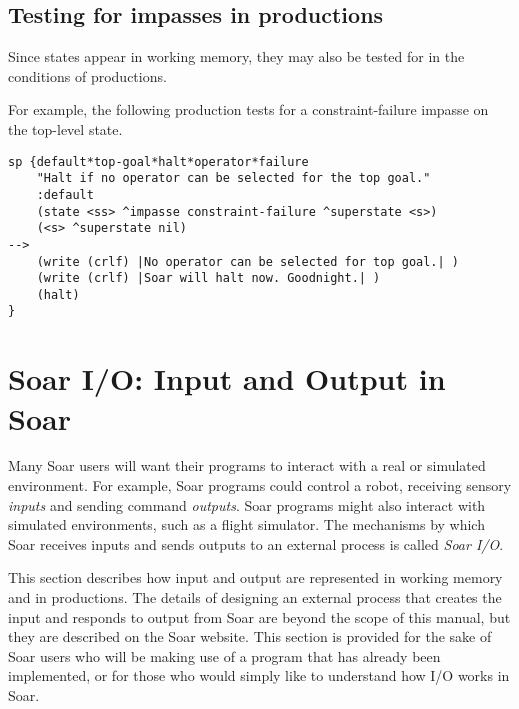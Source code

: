 \subsection{Testing for impasses in productions}

Since states appear in working memory, they may also be
tested for in the conditions of productions.


For example, the following production tests for a constraint-failure impasse
on the top-level state.

\begin{verbatim}
sp {default*top-goal*halt*operator*failure
    "Halt if no operator can be selected for the top goal."
    :default
    (state <ss> ^impasse constraint-failure ^superstate <s>)
    (<s> ^superstate nil)
-->
    (write (crlf) |No operator can be selected for top goal.| )
    (write (crlf) |Soar will halt now. Goodnight.| )
    (halt)
}
\end{verbatim}

\section{Soar I/O: Input and Output in Soar}
\label{SYNTAX-io}

Many Soar users will want their programs to interact with a real or simulated
environment. For example, Soar programs could control a robot, receiving sensory
\emph{inputs} and sending command \textit{outputs}. Soar programs might 
also interact with
simulated environments, such as a flight simulator. The mechanisms by which
Soar receives inputs and sends outputs to an external process is called
\emph{Soar I/O}.

This section describes how input and output are represented in working memory
and in productions.  The details of designing an external process that creates the input and 
responds to output from Soar are beyond the scope of this manual, but they are
described  
on the Soar website. This section is provided for the sake of Soar users who will be making
use of a program that has already been implemented, or for those who would
simply like to understand how I/O works in Soar.


